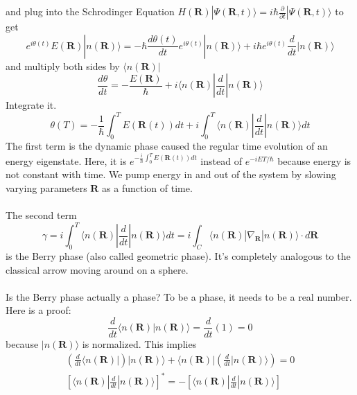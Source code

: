 \documentclass[a4paper,12pt]{article}
\renewcommand{\vec}[1]{\boldsymbol{\mathbf{#1}}}
\begin{document}
and plug into the Schrodinger Equation $H(\vec{R}) | \Psi(\vec{R},t) \rangle = i\hbar \frac{\partial}{\partial t} | \Psi(\vec{R},t) \rangle$ to get
\begin{equation}
e^{i\theta(t)} E(\vec{R}) | n(\vec{R}) \rangle = -\hbar \frac{d\theta(t)}{dt} e^{i\theta(t)} | n(\vec{R}) \rangle + i\hbar e^{i\theta(t)} \frac{d}{dt} | n(\vec{R}) \rangle
\end{equation}
and multiply both sides by $\langle n(\vec{R}) |$
\begin{equation}
\frac{d\theta}{dt}=-\frac{E(\vec{R})}{\hbar}+i \langle n(\vec{R}) | \frac{d}{dt} | n(\vec{R}) \rangle
\end{equation}
Integrate it.
\begin{equation}
\theta(T)=-\frac{1}{\hbar} \int_0^T E(\vec{R}(t))dt+i \int_0^T \langle n(\vec{R}) | \frac{d}{dt} | n(\vec{R}) \rangle dt
\end{equation}
The first term is the dynamic phase caused the regular time evolution of an energy eigenstate. Here, it is $e^{-\frac{i}{\hbar} \int_0^T E(\vec{R}(t))dt}$ instead of $e^{-iET/\hbar}$ because energy is not constant with time.  We pump energy in and out of the system by slowing varying parameters $\vec{R}$ as a function of time.
\\ \\
The second term
\begin{equation}
\gamma=i \int_0^T \langle n(\vec{R}) | \frac{d}{dt} | n(\vec{R}) \rangle dt=i \int_C \langle n(\vec{R}) | \nabla_{\vec{R}} | n(\vec{R}) \rangle \cdot d\vec{R}
\end{equation}
is the Berry phase (also called geometric phase).  It's completely analogous to the classical arrow moving around on a sphere.
\\ \\
Is the Berry phase actually a phase?  To be a phase, it needs to be a real number.  Here is a proof:
\begin{equation}
\frac{d}{dt} \langle n(\vec{R}) | n(\vec{R}) \rangle = \frac{d}{dt}(1)=0
\end{equation}
because $| n(\vec{R}) \rangle$ is normalized.  This implies
\setlength{\jot}{15pt}
\begin{eqnarray}
\left( \frac{d}{dt} \langle n(\vec{R}) | \right) | n(\vec{R}) \rangle + \langle n(\vec{R}) | \left( \frac{d}{dt} | n(\vec{R}) \rangle \right) = 0 \\
\left[ \langle n(\vec{R}) | \frac{d}{dt} | n(\vec{R}) \rangle \right]^* = - \left[ \langle n(\vec{R}) | \frac{d}{dt} | n(\vec{R}) \rangle \right]
\end{eqnarray}
\end{document}
